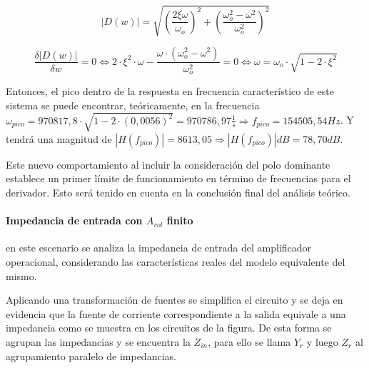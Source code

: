 \begin{equation*}
	|D(w)| = \sqrt{\left( \frac{2 \xi \omega}{\omega_o} \right)^{2} + \left( \frac{\omega_o^{2} - \omega^{2}}{\omega_o^{2}} \right)^{2}}
\end{equation*}

\begin{equation}
	\frac{\delta |D(w)|}{\delta w}
	= 0 \Leftrightarrow 2 \cdot \xi^{2} \cdot \omega - \frac{\omega \cdot (\omega_o^{2} - \omega^{2})}{\omega_o^{2}} = 0
	\Leftrightarrow
	\omega = \omega_o \cdot \sqrt{1 - 2 \cdot \xi^{2}}
\end{equation}

Entonces, el pico dentro de la respuesta en frecuencia caracter\'istico de este sistema se puede encontrar, te\'oricamente, en la frecuencia $\omega_{pico} = 970817,8 \cdot \sqrt{1- 2 \cdot (0,0056)^{2}} = 970786,97 \frac{1}{s} \Rightarrow f_{pico} = 154505,54Hz$. Y tendr\'a una magnitud de $|H(f_{pico})| = 8613,05 \Rightarrow |H(f_{pico})|dB = 78,70dB$.

Este nuevo comportamiento al incluir la consideraci\'on del polo dominante establece un primer l\'imite de funcionamiento en t\'ermino de frecuencias para el derivador. Esto ser\'a tenido en cuenta en la conclusi\'on final del an\'alisis te\'orico.


\paragraph*{Impedancia de entrada con $A_{vol}$ finito} en este escenario se analiza la impedancia de entrada del amplificador operacional, considerando las caracter\'isticas reales del modelo equivalente del mismo.



Aplicando una transformaci\'on de fuentes se simplifica el circuito y se deja en evidencia que la fuente de corriente correspondiente a la salida equivale a una impedancia como se muestra en los circuitos de la figura. %
De esta forma se agrupan las impedancias y se encuentra la $Z_{in}$, para ello se llama $Y_r$ y luego $Z_r$ al agrupamiento paralelo de impedancias.

